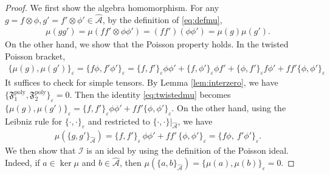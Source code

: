 \documentclass[11pt]{amsart}
\theoremstyle{definition}
\theoremstyle{plain}
\theoremstyle{conclusion}
\begin{document}
 \begin{proof}
 We first show the algebra homomorphism. For any $g = f \otimes \phi,g' = f' \otimes \phi' \in \widehat{\mathcal{A}}$, by the definition of \eqref{eq:defmu},  \begin{align*}
     \mu(gg') = \mu(f f' \otimes \phi \phi') = (ff')(\phi\phi') = \mu(g) \mu(g').
 \end{align*}  On the other hand, we show that the Poisson property holds. In the twisted Poisson bracket, \begin{align}
     \{\mu(g),\mu(g')\}_\varepsilon = \{f\phi,f'\phi'\}_\varepsilon = \{f,f'\}_\varepsilon \phi\phi' +  \{f,\phi'\}_\varepsilon \phi f' +  \{\phi,f'\}_\varepsilon f \phi' +  ff' \{\phi,\phi'\}_\varepsilon   \label{eq:twistedmu} 
 \end{align}  It suffices to check for simple tensors. By Lemma \ref{lem:interzero}, we have $\{\mathfrak{F}_1^{\mathrm{poly}},\mathfrak{F}_2^{\mathrm{poly}}\}_\varepsilon=0$. Then the identity \eqref{eq:twistedmu} becomes $ \{\mu(g),\mu(g')\}_\varepsilon =  \{f,f'\}_\varepsilon \phi\phi'  +  ff' \{\phi,\phi'\}_\varepsilon $. On the other hand, using the Leibniz rule for $\{\cdot ,\cdot \}_\varepsilon$ and restricted to $\{\cdot,\cdot\}\vert_{\widehat{\mathcal{A}}}$, we have \begin{align*}
    \mu\left(\{g, g'\}_{\widehat{\mathcal{A}}}\right) =\{f,f'\}_\varepsilon\,\phi\phi' +  ff'\,\{\phi,\phi'\}_\varepsilon =\{f\phi,\ f'\phi'\}_\varepsilon.
\end{align*} We then show that $\mathcal{I}$ is an ideal by using the definition of the Poisson ideal. Indeed, if $a\in\ker\mu$ and $b\in\widehat{\mathcal{A}}$, then
$\mu(\{a,b\}_{\widehat{\mathcal{A}}})=\{\mu(a),\mu(b)\}_\varepsilon=0$. 
 \end{proof} 
 
\end{document}
